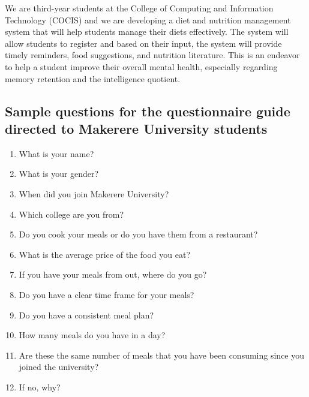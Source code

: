 \documentclass {article}
\begin{document}
\noindent We are third-year students at the College of Computing and Information Technology (COCIS) and we are developing a diet and nutrition management system that will help students manage their diets effectively. The system will allow students to register and based on their input, the system will provide timely reminders, food suggestions, and nutrition literature. This is an endeavor to help a student improve their overall mental health, especially regarding memory retention and the intelligence quotient.\\

\subsection{Sample questions for the questionnaire guide directed to Makerere University students}
\begin{enumerate}
\item What is your name?
\item What is your gender?
\item When did you join Makerere University?
\item Which college are you from?
\item Do you cook your meals or do you have them from a restaurant?
\item What is the average price of the food you eat?
\item If you have your meals from out, where do you go?
\item Do you have a clear time frame for your meals?
\item Do you have a consistent meal plan?
\item How many meals do you have in a day?
\item Are these the same number of meals that you have been consuming since you joined the university?
\item If no, why?
\end{enumerate}
\end{document}
